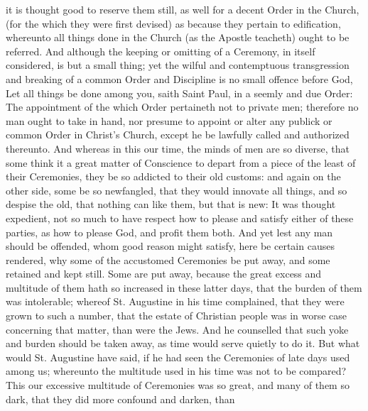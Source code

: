 it is thought good to reserve them still, as well for a decent Order in the Church, (for the which they were first devised) as because they pertain to edification, whereunto all things done in the Church (as the Apostle teacheth) ought to be referred. And although the keeping or omitting of a Ceremony, in itself considered, is but a small thing; yet the wilful and contemptuous transgression and breaking of a common Order and Discipline is no small offence before God, Let all things be done among you, saith Saint Paul, in a seemly and due Order: The appointment of the which Order pertaineth not to private men; therefore no man ought to take in hand, nor presume to appoint or alter any publick or common Order in Christ's Church, except he be lawfully called and authorized thereunto. And whereas in this our time, the minds of men are so diverse, that some think it a great matter of Conscience to depart from a piece of the least of their Ceremonies, they be so addicted to their old customs: and again on the other side, some be so newfangled, that they would innovate all things, and so despise the old, that nothing can like them, but that is new: It was thought expedient, not so much to have respect how to please and satisfy either of these parties, as how to please God, and profit them both. And yet lest any man should be offended, whom good reason might satisfy, here be certain causes rendered, why some of the accustomed Ceremonies be put away, and some retained and kept still. Some are put away, because the great excess and multitude of them hath so increased in these latter days, that the burden of them was intolerable; whereof St. Augustine in his time complained, that they were grown to such a number, that the estate of Christian people was in worse case concerning that matter, than were the Jews. And he counselled that such yoke and burden should be taken away, as time would serve quietly to do it. But what would St. Augustine have said, if he had seen the Ceremonies of late days used among us; whereunto the multitude used in his time was not to be compared? This our excessive multitude of Ceremonies was so great, and many of them so dark, that they did more confound and darken, than

